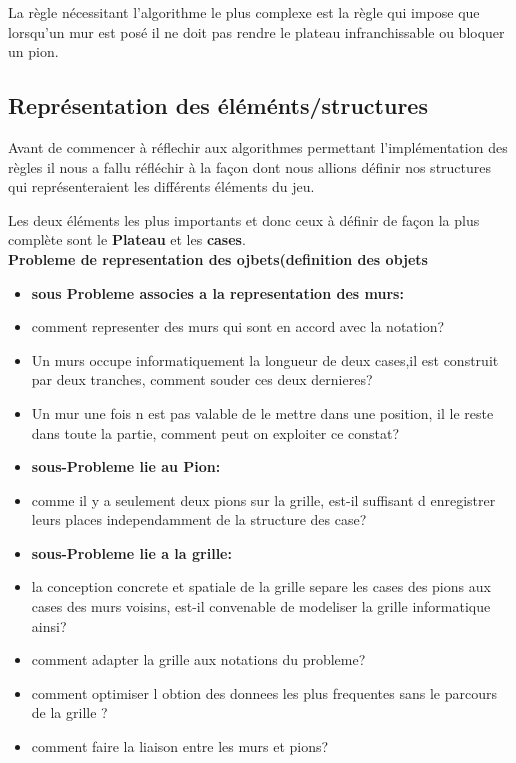 \documentclass[a4paper, draft]{article}
\begin{document}
La règle nécessitant l'algorithme le plus complexe est la règle qui impose que lorsqu'un mur est posé il ne doit pas rendre le plateau infranchissable ou bloquer un pion.


\subsection{Représentation des éléménts/structures}

Avant de commencer à réflechir aux algorithmes permettant l'implémentation des règles il nous a fallu réfléchir à la façon dont nous allions définir nos structures
qui représenteraient les différents éléments du jeu. 

Les deux éléments les plus importants et donc ceux à définir de façon la plus complète sont le \textbf{Plateau} et les \textbf{cases}.\\
\textbf{Probleme de representation des ojbets(definition des objets}\\
\begin{itemize}
 
\item \textbf{sous Probleme associes a la representation des murs:}\\
\item comment representer des murs qui sont en accord avec la notation? 
\item Un murs occupe informatiquement la longueur de deux cases,il est construit par deux tranches, comment souder ces deux dernieres?
\item Un mur une fois n est pas valable de le mettre dans une position, il le reste dans toute la partie, comment peut on exploiter ce constat?\\

\item \textbf{sous-Probleme lie au Pion:}\\
\item comme il y a seulement deux pions sur la grille, est-il suffisant d enregistrer leurs places independamment de la structure des case?\\

\item \textbf{ sous-Probleme lie a la grille:}\\
\item la conception concrete et spatiale de la grille separe les cases des pions aux cases des murs voisins, est-il convenable de modeliser la grille informatique ainsi?
\item comment adapter la grille aux notations du probleme?
\item comment optimiser l obtion des donnees les plus frequentes sans le parcours de la grille ?
\item comment faire la liaison entre les murs et pions?\\
\end{itemize}
\end{document}
